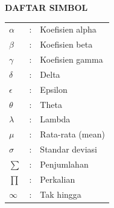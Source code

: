 
\begin{center}
    {\fontsize{14}{16}\selectfont\bfseries DAFTAR SIMBOL}
\end{center}

\vspace{0.5\baselineskip}


\noindent
\begin{tabular}{@{}p{2cm}cp{10cm}@{}}
    $\alpha$ & : & Koefisien alpha \\[0.3cm]
    $\beta$ & : & Koefisien beta \\[0.3cm]
    $\gamma$ & : & Koefisien gamma \\[0.3cm]
    $\delta$ & : & Delta \\[0.3cm]
    $\epsilon$ & : & Epsilon \\[0.3cm]
    $\theta$ & : & Theta \\[0.3cm]
    $\lambda$ & : & Lambda \\[0.3cm]
    $\mu$ & : & Rata-rata (mean) \\[0.3cm]
    $\sigma$ & : & Standar deviasi \\[0.3cm]
    $\sum$ & : & Penjumlahan \\[0.3cm]
    $\prod$ & : & Perkalian \\[0.3cm]
    $\infty$ & : & Tak hingga \\[0.3cm]
\end{tabular}
